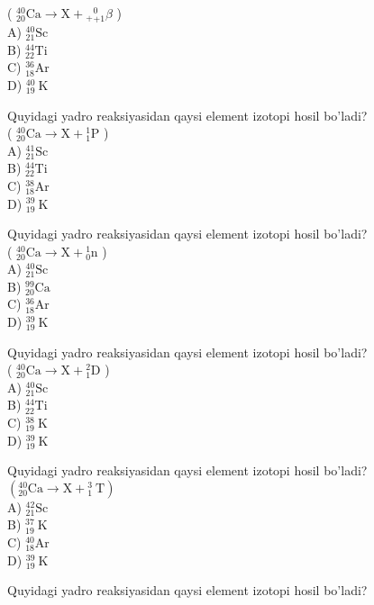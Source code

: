 ( ${ }_{20}^{40} \mathrm{Ca} \rightarrow \mathrm{X}+{ }_{+}{ }_{+1}^{0} \beta$ )\\
A) ${ }_{21}^{40} \mathrm{Sc}$\\
B) ${ }_{22}^{44} \mathrm{Ti}$\\
C) ${ }_{18}^{36} \mathrm{Ar}$\\
D) ${ }_{19}^{40} \mathrm{~K}$
  \item Quyidagi yadro reaksiyasidan qaysi element izotopi hosil bo'ladi?\\
( ${ }_{20}^{40} \mathrm{Ca} \rightarrow \mathrm{X}+{ }_{1}^{1} \mathrm{P}$ )\\
A) ${ }_{21}^{41} \mathrm{Sc}$\\
B) ${ }_{22}^{44} \mathrm{Ti}$\\
C) ${ }_{18}^{38} \mathrm{Ar}$\\
D) ${ }_{19}^{39} \mathrm{~K}$
  \item Quyidagi yadro reaksiyasidan qaysi element izotopi hosil bo'ladi?\\
( ${ }_{20}^{40} \mathrm{Ca} \rightarrow \mathrm{X}+{ }_{0}^{1} \mathrm{n}$ )\\
A) ${ }_{21}^{40} \mathrm{Sc}$\\
B) ${ }_{20}^{99} \mathrm{Ca}$\\
C) ${ }_{18}^{36} \mathrm{Ar}$\\
D) ${ }_{19}^{39} \mathrm{~K}$
  \item Quyidagi yadro reaksiyasidan qaysi element izotopi hosil bo'ladi?\\
( ${ }_{20}^{40} \mathrm{Ca} \rightarrow \mathrm{X}+{ }_{1}^{2} \mathrm{D}$ )\\
A) ${ }_{21}^{40} \mathrm{Sc}$\\
B) ${ }_{22}^{44} \mathrm{Ti}$\\
C) ${ }_{19}^{38} \mathrm{~K}$\\
D) ${ }_{19}^{39} \mathrm{~K}$
  \item Quyidagi yadro reaksiyasidan qaysi element izotopi hosil bo'ladi?\\
$\left({ }_{20}^{40} \mathrm{Ca} \rightarrow \mathrm{X}+{ }_{1}^{3} \mathrm{~T}\right)$\\
A) ${ }_{21}^{42} \mathrm{Sc}$\\
B) ${ }_{19}^{37} \mathrm{~K}$\\
C) ${ }_{18}^{40} \mathrm{Ar}$\\
D) ${ }_{19}^{39} \mathrm{~K}$
  \item Quyidagi yadro reaksiyasidan qaysi element izotopi hosil bo'ladi?\\
